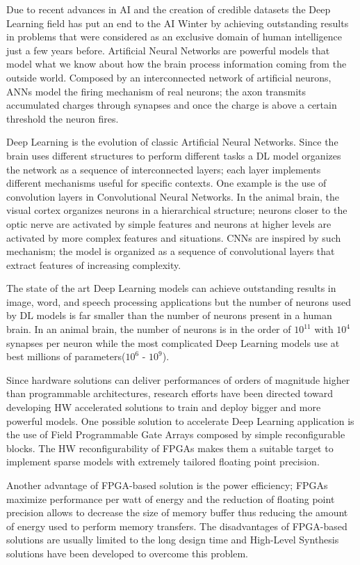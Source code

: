\documentclass[../main.tex]{subfiles}
\begin{document}
Due to recent advances in AI and the creation of credible datasets the Deep Learning field has put an end to the AI Winter by achieving outstanding results in problems that were considered as an exclusive domain of human intelligence just a few years before.
Artificial Neural Networks are powerful models that model what we know about how the brain process information coming from the outside world. 
Composed by an interconnected network of artificial neurons, ANNs model the firing mechanism of real neurons; the axon transmits accumulated charges through synapses and once the charge is above a certain threshold the neuron fires.

Deep Learning is the evolution of classic Artificial Neural Networks. 
Since the brain uses different structures to perform different tasks a DL model organizes the network as a sequence of interconnected layers; each layer implements different mechanisms useful for specific contexts.
One example is the use of convolution layers in Convolutional Neural Networks.
In the animal brain, the visual cortex organizes neurons in a hierarchical structure; neurons closer to the optic nerve are activated by simple features and neurons at higher levels are activated by more complex features and situations.
CNNs are inspired by such mechanism; the model is organized as a sequence of convolutional layers that extract features of increasing complexity.

The state of the art Deep Learning models can achieve outstanding results in image, word, and speech processing applications but the number of neurons used by DL models is far smaller than the number of neurons present in a human brain.
In an animal brain, the number of neurons is in the order of $10^{11}$ with $10^4$ synapses per neuron while the most complicated Deep Learning models use at best millions of parameters($10^6$ - $10^9$).

Since hardware solutions can deliver performances of orders of magnitude higher than programmable architectures, research efforts have been directed toward developing HW accelerated solutions to train and deploy bigger and more powerful models.
One possible solution to accelerate Deep Learning application is the use of Field Programmable Gate Arrays composed by simple reconfigurable blocks.
The HW reconfigurability of FPGAs makes them a suitable target to implement sparse models with extremely tailored floating point precision.

Another advantage of FPGA-based solution is the power efficiency; FPGAs maximize performance per watt of energy and the reduction of floating point precision allows to decrease the size of memory buffer thus reducing the amount of energy used to perform memory transfers.
The disadvantages of FPGA-based solutions are usually limited to the long design time and High-Level Synthesis solutions have been developed to overcome this problem.
\end{document}
